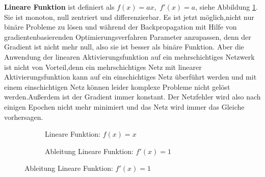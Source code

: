 \documentclass[12pt,a4paper]{scrartcl}
\numberwithin{equation}{section}
\begin{document}
\textbf{Lineare Funktion } ist definiert als $ f(x) = ax, $	$ f '(x) = a$, siehe Abbildung \ref{fig:Lineare Funktion}. Sie ist monoton, null zentriert und differenzierbar. Es ist jetzt möglich,nicht nur binäre Probleme zu lösen und während der Backpropagation mit Hilfe von gradientenbasierenden Optimierungsverfahren  Parameter anzupassen, denn der Gradient ist nicht mehr null, also sie ist besser als binäre Funktion. Aber die Anwendung der linearen Aktivierungsfunktion auf ein mehrschichtiges Netzwerk ist nicht von Vorteil,denn ein mehrschichtiges Netz mit linearer Aktivierungsfunktion kann auf ein einschichtiges Netz überführt werden und mit einem einschichtigen Netz können leider komplexe Probleme nicht gelöst werden.Außerdem ist der Gradient immer konstant. Der Netzfehler wird also nach einigen Epochen nicht mehr minimiert und das Netz wird immer das Gleiche vorhersagen.		
\begin{figure}[ht]
	\caption{Lineare Funktion}
	\begin{subfigure}{.5\textwidth}
		\centering
		
		\caption{Lineare Funktion: $ f(x) = x $}
	\end{subfigure}%
	\begin{subfigure}{.5\textwidth}
		\centering
		\caption{Ableitung Lineare Funktion: $ f'(x) =1 $}
	\end{subfigure}
	\label{fig:Lineare Funktion}
	
\end{figure}
\end{document}

